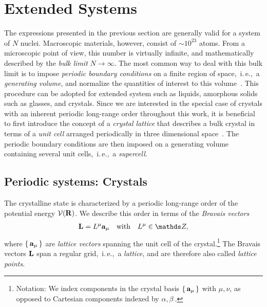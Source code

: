 \section{Extended Systems}
\label{sec:extended_systems}
The expressions presented in the previous section are generally valid for a system of $N$ nuclei. Macroscopic materials, however, consist of $\sim 10^{23}$ atoms. From a microscopic point of view, this number is virtually infinite, and mathematically described by the \emph{bulk limit} $N \to \infty$. The most common way to deal with this bulk limit is to impose \emph{periodic boundary conditions} on a finite region of space,~i.\,e.,~a \emph{generating volume}, and normalize the quantities of interest to this volume~\cite{BornHuang}. This procedure can be adopted for extended system such as liquids, amorphous solids such as glasses, and crystals. Since we are interested in the special case of crystals with an inherent periodic long-range order throughout this work, it is beneficial to first introduce the concept of a \emph{crystal lattice} that describes a bulk crystal in terms of a \emph{unit cell} arranged periodically in three dimensional space~\cite{Sands1969}. The periodic boundary conditions are then imposed on a generating volume containing several unit cells,~i.\,e.,~a \emph{supercell}.

\subsection{Periodic systems: Crystals}
{The crystalline state is characterized by a periodic long-range order of the potential energy $\mathcal V ({\bf R})$}. We describe this order in terms of the \emph{Bravais vectors} 
\begin{align}
	{\bf L} = L^\mu {\bf a}_\mu \quad\text{with}\quad L^\mu \in \mathds Z,
	\label{eq:L_Bravais}
\end{align}
where $\set{{\bf a}_\mu}$ are \emph{lattice vectors} spanning the unit cell of the %
crystal.\footnote{Notation: We index components in the crystal basis $\set{{\bf a}_\mu}$ with $\mu, \nu$, as opposed to Cartesian components indexed by $\alpha, \beta~.$} The Bravais vectors $\bf L$ span a regular grid,~i.\,e.,~a \emph{lattice}, and are therefore also called \emph{lattice points}.

